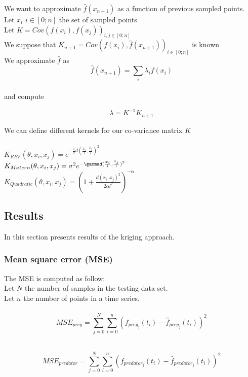 \documentclass{article}
\begin{document}
We want to approximate $\hat{f}(x_{n+1})$ as a function of previous sampled points.   \\
Let $x_i$ $i \in [0;n]$ the set of sampled points  \\
Let $K = Cov(f(x_i),f(x_j))_{i,j \in [0;n]}$   \\
We suppose that $K_{n+1} = Cov(f(x_i), \hat{f}(x_{n+1}))_{i \in [0;n]}$ is known   \\ 
We approximate $\hat{f}$ as
\begin{equation}
    \hat{f}(x_{n+1}) = \sum_i \lambda_i f(x_i) 
\end{equation}
   \\
and compute 

\begin{equation}
  \lambda = K^{-1} K_{n+1}    
\end{equation}{}
 

We can define different kernels for our co-variance matrix $K$   \\ 
  \\ 
$K_{RBF}(\theta, x_i, x_j) = e^{-\frac{1}{2}d(\frac{x_i}{l},\frac{x_j}{l})^2}$
  \\
$K_{Matern}(\theta, x_i, x_j) =\sigma^2 e^{-\gammad(\frac{x_i}{l},\frac{x_j}{l})^2}$
  \\ 
$K_{Quadratic}(\theta, x_i, x_j) = (1+ \frac{d(x_i,x_j)^2}{2\alpha l^2})^{-\alpha}$


\subsection{Results}
In this section presents results of the kriging approach. 
\subsubsection{Mean square error (MSE)}

The MSE is computed as follow:  \\
Let $N$ the number of samples in the testing data set.  \\
Let $n$ the number of points in a time series.   
 \\  
 \\  
 \begin{equation}
     MSE_{prey} = \sum_{j=0}^{N} \sum_{i=0}^{n} (f_{prey_j}(t_i) - \hat{f}_{prey_j}(t_i))^2 
 \end{equation}
 
\\  
\begin{equation}
    MSE_{predator} = \sum_{j=0}^{N} \sum_{i=0}^{n} (f_{predator_j}(t_i) - \hat{f}_{predator_j}(t_i))^2 
\end{equation}
\end{document}
